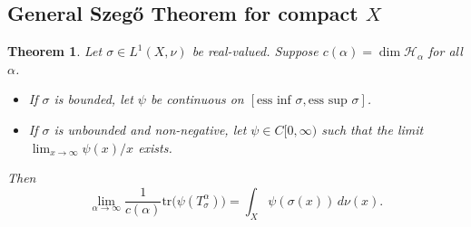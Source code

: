 \documentclass{amsart}
\newtheorem{thm}{Theorem}[section]
\theoremstyle{definition}
\theoremstyle{remark}
\numberwithin{equation}{section}
\newcommand{\tr}{\text{tr}} %
\newcommand{\calF}{\mathcal{F}}
\begin{document}
\subsection{General Szeg\H{o} Theorem for compact $X$}

\begin{thm}\label{thm:general_szego}
Let $\sigma\in L^1(X,\nu)$ be real-valued. Suppose $c(\alpha)=\dim \mathcal{H}_\alpha$ for all $\alpha$.
\begin{itemize}
    \item[(i)] If $\sigma$ is bounded, let $\psi$ be continuous on $[\text{ess inf } \sigma, \text{ess sup }\sigma]$.
    \item[(ii)] If $\sigma$ is unbounded and non-negative, let $\psi\in C[0,\infty)$ such that the limit $\lim_{x\to\infty} \psi(x)/x$ exists.
\end{itemize}

Then
\[
    \lim_{\alpha\to\infty} \frac{1}{c(\alpha)} \tr\big(\psi(T_\sigma^\alpha)\big)
    = \int_X \psi(\sigma(x)) \, d\nu(x).
\]
\end{thm}
\end{document}
